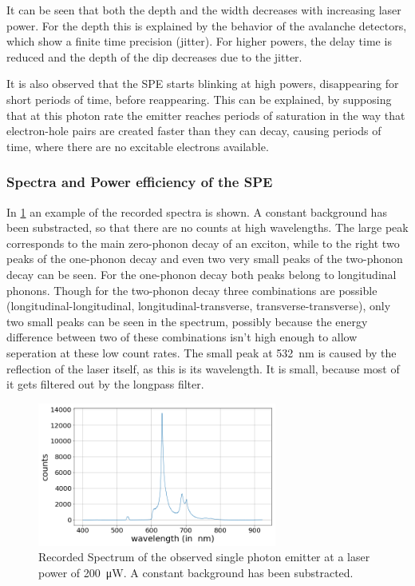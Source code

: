 It can be seen that both the depth and the width decreases with increasing laser power.
For the depth this is explained by the behavior of the avalanche detectors, which show a finite time precision (jitter).
For higher powers, the delay time is reduced and the depth of the dip decreases due to the jitter.

It is also observed that the SPE starts blinking at high powers, disappearing for short periods of time, before reappearing.
This can be explained, by supposing that at this photon rate the emitter reaches periods of saturation in the way that electron-hole pairs are created faster than they can decay, causing periods of time, where there are no excitable electrons available.

\subsubsection{Spectra and Power efficiency of the SPE}

In \cref{fig_spe_spectrum_example} an example of the recorded spectra is shown.
A constant background has been substracted, so that there are no counts at high wavelengths.
The large peak corresponds to the main zero-phonon decay of an exciton, while to the right two peaks of the one-phonon decay and even two very small peaks of the two-phonon decay can be seen.
For the one-phonon decay both peaks belong to longitudinal phonons.
Though for the two-phonon decay three combinations are possible (longitudinal-longitudinal, longitudinal-transverse, transverse-transverse), only two small peaks can be seen in the spectrum, possibly because the energy difference between two of these combinations isn't high enough to allow seperation at these low count rates.
The small peak at \SI{532}{nm} is caused by the reflection of the laser itself, as this is its wavelength.
It is small, because most of it gets filtered out by the longpass filter.

\begin{figure}[H]
    \centering
    \includegraphics[width=0.7\textwidth]{img/output_t2/spektrum_example_bgcorr_200.0muW.png}
    \caption{Recorded Spectrum of the observed single photon emitter at a laser power of \SI{200}{\micro W}. A constant background has been substracted.}
    \label{fig_spe_spectrum_example}
\end{figure}

